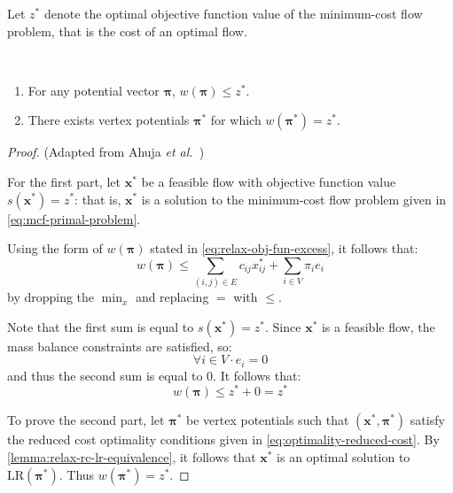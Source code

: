\begin{defn}
Let $z^*$ denote the optimal objective function value of the minimum-cost flow problem, that is the cost of an optimal flow. \\
\end{defn}

\begin{lemma} \label{lemma:relax-dual-optimality}
~ %
\begin{enumerate}[label=(\alph*)]
    \item For any potential vector $\boldsymbol{\pi}$, $w(\boldsymbol{\pi}) \leq z^*$.
    \item There exists vertex potentials $\boldsymbol{\pi}^*$ for which $w(\boldsymbol{\pi}^*) = z^*$.
\end{enumerate}
\end{lemma}
\begin{proof} (Adapted from Ahuja \textit{et al.}~\cite[lemma.~9.16]{Ahuja:1993})
    
For the first part, let $\mathbf{x}^*$ be a feasible flow with objective function value $s(\mathbf{x}^*) = z^*$: that is, $\mathbf{x}^*$ is a solution to the minimum-cost flow problem given in \cref{eq:mcf-primal-problem}.

Using the form of $w(\boldsymbol{\pi})$ stated in \cref{eq:relax-obj-fun-excess}, it follows that:
\[w(\boldsymbol{\pi})\leq\sum_{\left(i,j\right)\in E}c_{ij}x_{ij}^{*}+\sum_{i\in V}\pi_{i}e_{i}\]
by dropping the $\min_x$ and replacing $=$ with $\leq$.

Note that the first sum is equal to $s(\mathbf{x}^*) = z^*$. Since $\mathbf{x}^*$ is a feasible flow, the mass balance constraints are satisfied, so:
\[\forall i \in V\cdot e_i = 0\]
and thus the second sum is equal to $0$. It follows that:
\[w(\boldsymbol{\pi}) \leq z^* + 0 = z^*\]

To prove the second part, let $\boldsymbol{\pi}^*$ be vertex potentials such that $\left(\mathbf{x}^*,\boldsymbol{\pi}^*\right)$ satisfy the reduced cost optimality conditions given in \cref{eq:optimality-reduced-cost}\footnotemark. By \cref{lemma:relax-rc-lr-equivalence}, it follows that $\mathbf{x}^*$ is an optimal solution to $\mathrm{LR}(\boldsymbol{\pi}^*)$. Thus $w(\boldsymbol{\pi}^*) = z^*$.
\end{proof}


